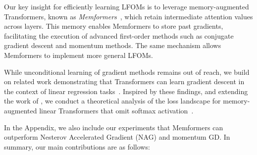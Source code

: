 \documentclass[11pt]{article}
\numberwithin{equation}{section}
\begin{document}
Our key insight for efficiently learning LFOMs is to leverage memory-augmented Transformers, known as \emph{Memformers}~\citep{wu2020Memformer, xu2021transformer}, which retain intermediate attention values across layers. This memory enables Memformers to store past gradients, facilitating the execution of advanced first-order methods such as conjugate gradient descent and momentum methods. The same mechanism allows Memformers to implement more general LFOMs.

While unconditional learning of gradient methods remains out of reach, we build on related work demonstrating that Transformers can learn gradient descent in the context of linear regression tasks~\citep{garg2022can, akyurek2022learning, von2023transformers, ahn2024transformers, zhang2024trained}. Inspired by these findings, and extending the work of \citet{ahn2024transformers}, we conduct a theoretical analysis of the loss landscape for memory-augmented linear Transformers that omit softmax activation~\citep{schlag2021linear, von2023transformers, ahn2024transformers}.

In the Appendix, we also include our experiments that Memformers can outperform Nesterov Accelerated Gradient (NAG) and momentum GD. In summary, our main contributions are as follows:
\end{document}
